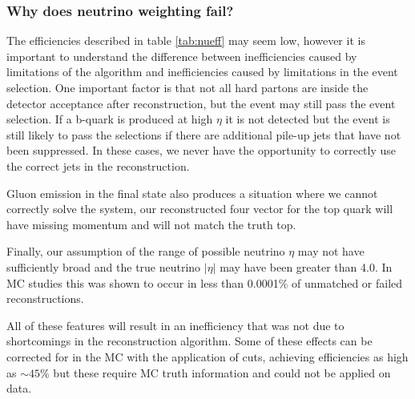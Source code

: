 \subsubsection{Why does neutrino weighting fail?}
The efficiencies described in table \ref{tab:nueff} may seem low, however it is important to understand the difference between inefficiencies caused by limitations of the algorithm and inefficiencies caused by limitations in the event selection. One important factor is that not all hard partons are inside the detector acceptance after reconstruction, but the event may still pass the event selection. If a b-quark is produced at high $\eta$ it is not detected but the event is still likely to pass the selections if there are additional pile-up jets that have not been suppressed. In these cases, we never have the opportunity to correctly use the correct jets in the reconstruction. 

Gluon emission in the final state also produces a situation where we cannot correctly solve the system, our reconstructed four vector for the top quark will have missing momentum and will not match the truth top. 

Finally, our assumption of the range of possible neutrino $\eta$ may not have sufficiently broad and the true neutrino $|\eta|$ may have been greater than 4.0. In MC studies this was shown to occur in less than 0.0001\% of unmatched or failed reconstructions.

All of these features will result in an inefficiency that was not due to shortcomings in the reconstruction algorithm. Some of these effects can be corrected for in the MC with the application of cuts, achieving efficiencies as high as $\sim45\%$ but these require MC truth information and could not be applied on data.

